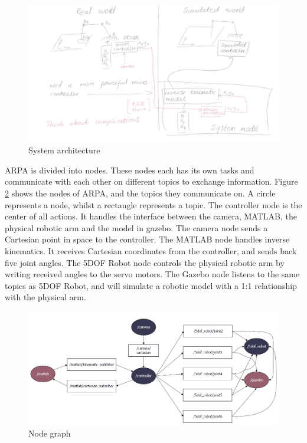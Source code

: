 \documentclass[11pt,a4paper, titlepage]{article}
\begin{document}
	\begin{figure}[H]
		\includegraphics[width=\linewidth]{../Diagrams/Architecture.png}
		\caption{System architecture}
		\label{fig:architecture}
	\end{figure}
	
	ARPA is divided into nodes. These nodes each has its own tasks and communicate with each other on different topics to exchange information. Figure \ref{fig:nodegraph} shows the nodes of ARPA, and the topics they communicate on. A circle represents a node, whilst a rectangle represents a topic. The controller node is the center of all actions. It handles the interface between the camera, MATLAB, the physical robotic arm and the model in gazebo. The camera node  sends a Cartesian point in space to the controller. The MATLAB node handles inverse kinematics. It receives Cartesian coordinates from the controller, and sends back five joint angles. The 5DOF Robot node controls the physical robotic arm by writing received angles to the servo motors. The Gazebo node listens to the same topics as 5DOF Robot, and will simulate a robotic model with a 1:1 relationship with the physical arm.
	
	\begin{figure}[H]
		\includegraphics[width=\linewidth]{../Diagrams/NodeGraph-v1.png}
		\caption{Node graph}
		\label{fig:nodegraph}
	\end{figure}
	
\end{document}
